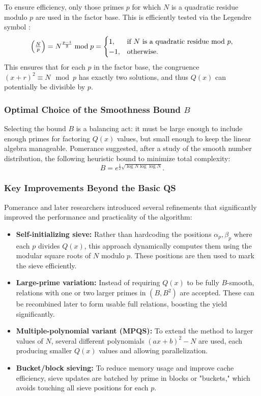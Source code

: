 \documentclass[a4paper, 11pt]{article}
\begin{document}
To ensure efficiency, only those primes $p$ for which $N$ is a quadratic residue modulo $p$ are used in the factor base. This is efficiently tested via the Legendre symbol \cite{Legendre1798}:
\begin{equation}
\Bigl(\tfrac{N}{p}\Bigr) = N^{\frac{p-1}{2}} \bmod p =
\begin{cases}
1, & \text{if } N \text{ is a quadratic residue mod } p, \\
-1, & \text{otherwise}.
\end{cases}
\end{equation}
This ensures that for each $p$ in the factor base, the congruence $(x + r)^2 \equiv N \mod p$ has exactly two solutions, and thus $Q(x)$ can potentially be divisible by $p$.

\subsubsection{Optimal Choice of the Smoothness Bound $B$}

Selecting the bound $B$ is a balancing act: it must be large enough to include enough primes for factoring $Q(x)$ values, but small enough to keep the linear algebra manageable. Pomerance suggested, after a study of the smooth number distribution, the following heuristic bound to minimize total complexity:
\begin{equation}
B = e^{\frac{1}{2} \sqrt{\log N \log \log N}}.
\end{equation}

\subsubsection{Key Improvements Beyond the Basic QS}

Pomerance and later researchers introduced several refinements that significantly improved the performance and practicality of the algorithm:
\begin{itemize}
\item \textbf{Self-initializing sieve:} Rather than hardcoding the positions $\alpha_p, \beta_p$ where each $p$ divides $Q(x)$, this approach dynamically computes them using the modular square roots of $N$ modulo $p$. These positions are then used to mark the sieve efficiently.
\item \textbf{Large-prime variation:} Instead of requiring $Q(x)$ to be fully $B$-smooth, relations with one or two larger primes in $(B, B^2)$ are accepted. These can be recombined later to form usable full relations, boosting the yield significantly.
\item \textbf{Multiple-polynomial variant (MPQS):} To extend the method to larger values of $N$, several different polynomials $(ax + b)^2 - N$ are used, each producing smaller $Q(x)$ values and allowing parallelization.
\item \textbf{Bucket/block sieving:} To reduce memory usage and improve cache efficiency, sieve updates are batched by prime in blocks or "buckets," which avoids touching all sieve positions for each $p$.
\end{itemize}
\end{document}
